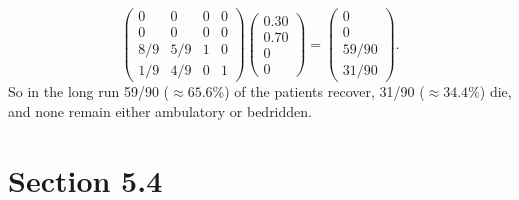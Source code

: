 \documentclass[12pt]{article}
\begin{document}
\begin{enumerate}
\begin{equation*}
\begin{pmatrix}
0 & 0 & 0 & 0 \\
0 & 0 & 0 & 0 \\
8/9 & 5/9 & 1 & 0 \\
1/9 & 4/9 & 0 & 1
\end{pmatrix}
\begin{pmatrix}
0.30 \\
0.70 \\
0 \\
0
\end{pmatrix}
= \begin{pmatrix}
0 \\
0 \\
59/90 \\
31/90
\end{pmatrix}.
\end{equation*}
So in the long run 59/90 ($\approx 65.6\%$) of the patients recover, 31/90 ($\approx 34.4\%$) die, and none remain either ambulatory or bedridden.

\end{enumerate}

\section*{Section 5.4}
\end{document}
